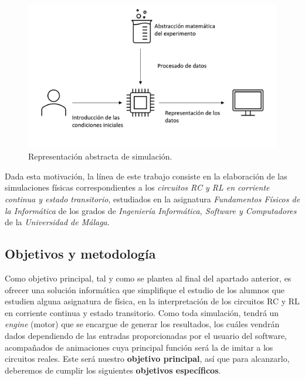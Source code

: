 \documentclass[../main.tex]{subfiles}
\begin{document}
\begin{figure}
    \centering
    \includegraphics{images/Figura1.1.png}
    \caption{Representación abstracta de simulación.}
    \label{fig:1.1}
\end{figure}

Dada esta motivación, la línea de este trabajo consiste en la elaboración de las simulaciones físicas correspondientes a los \textit{circuitos RC y RL en corriente continua y estado transitorio},  estudiados en la asignatura \textit{Fundamentos Físicos de la Informática} de los grados de \textit{Ingeniería Informática, Software y Computadores} de la \textit{Universidad de Málaga}.

\subsection{Objetivos y metodología}

Como objetivo principal, tal y como se plantea al final del apartado anterior, es ofrecer una solución informática que simplifique el estudio de los alumnos que estudien alguna asignatura de física, en la interpretación de los circuitos RC y RL en corriente continua y estado transitorio. Como toda simulación, tendrá un \textit{engine} (motor) que se encargue de generar los resultados, los cuáles vendrán dados dependiendo de las entradas proporcionadas por el usuario del software, acompañados de animaciones cuya principal función será la de imitar a los circuitos reales. Este será nuestro \textbf{objetivo principal}, así que para alcanzarlo, deberemos de cumplir los siguientes \textbf{objetivos específicos}.\\
\end{document}
